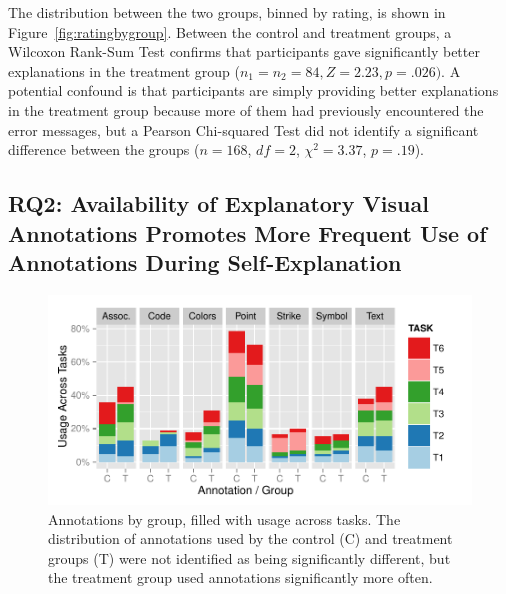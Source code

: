\documentclass[conference]{IEEEtran}
\begin{document}
The distribution between the two groups, binned by rating, is shown in Figure~\ref{fig:ratingbygroup}. Between the control and treatment groups, a Wilcoxon Rank-Sum Test confirms that participants gave significantly better explanations in the treatment group ($n_1 = n_2 = 84, Z = 2.23, p = .026)$. A potential confound is that participants are simply providing better explanations in the treatment group because more of them had previously encountered the error messages, but a Pearson Chi-squared Test did not identify a significant difference between the groups ($n = 168$, $df = 2$, $\chi^2 = 3.37$, $p = .19$).

\subsection{RQ2: Availability of Explanatory Visual Annotations Promotes More Frequent Use of Annotations During Self-Explanation}


\begin{figure}[!t]
\centering
\includegraphics[width=\columnwidth]{annotation_by_group}
\caption{Annotations by group, filled with usage across tasks. The distribution of annotations used by the control (C) and treatment groups (T) were not identified as being significantly different, but the treatment group used annotations significantly more often.}\label{fig:annotationbygroup}
\end{figure}
\end{document}

